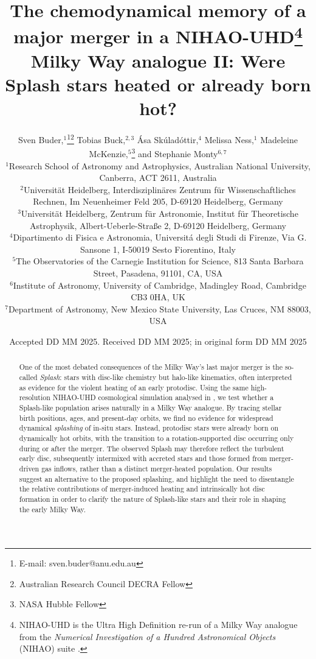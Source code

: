\documentclass[fleqn,usenatbib]{mnras}
\title[Were Splash stars heated or already born hot?]{The chemodynamical memory of a major merger in a NIHAO-UHD\thanks{NIHAO-UHD is the Ultra High Definition re-run of a Milky Way analogue from the \textit{Numerical Investigation of a Hundred Astronomical Objects} (NIHAO) suite \citep{Wang2015}.} Milky Way analogue II: Were Splash stars heated or already born hot?}
\author[S. Buder et al.]{Sven Buder,$^{1}$\thanks{E-mail: sven.buder@anu.edu.au}\thanks{Australian Research Council DECRA Fellow}\orcidlink{0000-0002-4031-8553}
Tobias Buck,$^{2,3}$\orcidlink{0000-0003-2027-399X}
Ása Skúladóttir,$^{4}$\orcidlink{0000-0001-9155-9018}
Melissa Ness,$^{1}$\orcidlink{0000-0001-5082-6693}
Madeleine McKenzie,$^{5}$\thanks{NASA Hubble Fellow}\orcidlink{0000-0002-1715-1257}
and\newauthor
Stephanie Monty$^{6, 7}$\orcidlink{0000-0002-9225-5822}
\\
$^{1}$Research School of Astronomy and Astrophysics, Australian National University, Canberra, ACT 2611, Australia\\
$^{2}$Universit{\"a}t Heidelberg, Interdisziplin{\"a}res Zentrum f{\"u}r Wissenschaftliches Rechnen, Im Neuenheimer Feld 205, D-69120 Heidelberg, Germany\\
$^{3}$Universit{\"a}t Heidelberg, Zentrum f{\"u}r Astronomie, Institut f{\"u}r Theoretische Astrophysik, Albert-Ueberle-Straße 2, D-69120 Heidelberg, Germany\\
$^{4}$Dipartimento di Fisica e Astronomia, Universitá degli Studi di Firenze, Via G. Sansone 1, I-50019 Sesto Fiorentino, Italy\\
$^{5}$The Observatories of the Carnegie Institution for Science, 813 Santa Barbara Street, Pasadena, 91101, CA, USA\\
$^{6}$Institute of Astronomy, University of Cambridge, Madingley Road, Cambridge CB3 0HA, UK\\
$^{7}$Department of Astronomy, New Mexico State University, Las Cruces, NM 88003, USA
}
\date{Accepted DD MM 2025. Received DD MM 2025; in original form DD MM 2025}
\begin{document}
\label{firstpage}
\pagerange{\pageref{firstpage}--\pageref{lastpage}}
\maketitle

\begin{abstract} %
One of the most debated consequences of the Milky Way’s last major merger is the so-called \textit{Splash}: stars with disc-like chemistry but halo-like kinematics, often interpreted as evidence for the violent heating of an early protodisc. Using the same high-resolution NIHAO-UHD cosmological simulation analysed in , we test whether a Splash-like population arises naturally in a Milky Way analogue. By tracing stellar birth positions, ages, and present-day orbits, we find no evidence for widespread dynamical \textit{splashing} of in-situ stars. Instead, protodisc stars were already born on dynamically hot orbits, with the transition to a rotation-supported disc occurring only during or after the merger. The observed Splash may therefore reflect the turbulent early disc, subsequently intermixed with accreted stars and those formed from merger-driven gas inflows, rather than a distinct merger-heated population. Our results suggest an alternative to the proposed splashing, and highlight the need to disentangle the relative contributions of merger-induced heating and intrinsically hot disc formation in order to clarify the nature of Splash-like stars and their role in shaping the early Milky Way.

\end{abstract}
\end{document}
